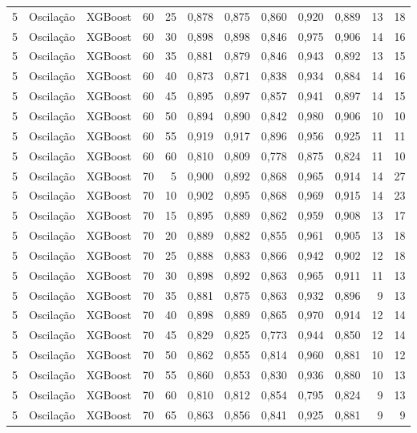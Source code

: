 \begin{longtable}{@{}rllrrrrrrrrr@{}}
5 & Oscilação & XGBoost & 60 & 25 & 0,878 & 0,875 & 0,860 & 0,920 & 0,889 & 13 & 18 \\
5 & Oscilação & XGBoost & 60 & 30 & 0,898 & 0,898 & 0,846 & 0,975 & 0,906 & 14 & 16 \\
5 & Oscilação & XGBoost & 60 & 35 & 0,881 & 0,879 & 0,846 & 0,943 & 0,892 & 13 & 15 \\
5 & Oscilação & XGBoost & 60 & 40 & 0,873 & 0,871 & 0,838 & 0,934 & 0,884 & 14 & 16 \\
5 & Oscilação & XGBoost & 60 & 45 & 0,895 & 0,897 & 0,857 & 0,941 & 0,897 & 14 & 15 \\
5 & Oscilação & XGBoost & 60 & 50 & 0,894 & 0,890 & 0,842 & 0,980 & 0,906 & 10 & 10 \\
5 & Oscilação & XGBoost & 60 & 55 & 0,919 & 0,917 & 0,896 & 0,956 & 0,925 & 11 & 11 \\
5 & Oscilação & XGBoost & 60 & 60 & 0,810 & 0,809 & 0,778 & 0,875 & 0,824 & 11 & 10 \\
5 & Oscilação & XGBoost & 70 & 5 & 0,900 & 0,892 & 0,868 & 0,965 & 0,914 & 14 & 27 \\
5 & Oscilação & XGBoost & 70 & 10 & 0,902 & 0,895 & 0,868 & 0,969 & 0,915 & 14 & 23 \\
5 & Oscilação & XGBoost & 70 & 15 & 0,895 & 0,889 & 0,862 & 0,959 & 0,908 & 13 & 17 \\
5 & Oscilação & XGBoost & 70 & 20 & 0,889 & 0,882 & 0,855 & 0,961 & 0,905 & 13 & 18 \\
5 & Oscilação & XGBoost & 70 & 25 & 0,888 & 0,883 & 0,866 & 0,942 & 0,902 & 12 & 18 \\
5 & Oscilação & XGBoost & 70 & 30 & 0,898 & 0,892 & 0,863 & 0,965 & 0,911 & 11 & 13 \\
5 & Oscilação & XGBoost & 70 & 35 & 0,881 & 0,875 & 0,863 & 0,932 & 0,896 & 9 & 13 \\
5 & Oscilação & XGBoost & 70 & 40 & 0,898 & 0,889 & 0,865 & 0,970 & 0,914 & 12 & 14 \\
5 & Oscilação & XGBoost & 70 & 45 & 0,829 & 0,825 & 0,773 & 0,944 & 0,850 & 12 & 14 \\
5 & Oscilação & XGBoost & 70 & 50 & 0,862 & 0,855 & 0,814 & 0,960 & 0,881 & 10 & 12 \\
5 & Oscilação & XGBoost & 70 & 55 & 0,860 & 0,853 & 0,830 & 0,936 & 0,880 & 10 & 13 \\
5 & Oscilação & XGBoost & 70 & 60 & 0,810 & 0,812 & 0,854 & 0,795 & 0,824 & 9 & 13 \\
5 & Oscilação & XGBoost & 70 & 65 & 0,863 & 0,856 & 0,841 & 0,925 & 0,881 & 9 & 9 \\

\end{longtable}

